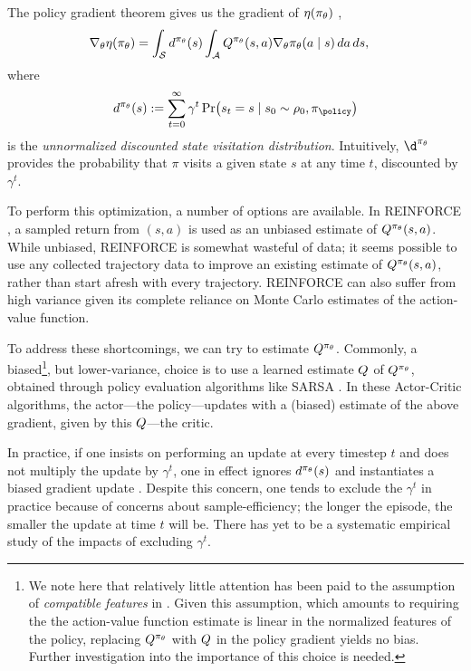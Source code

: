 \documentclass[\main/thesis.tex]{subfiles}
\begin{document}
The {policy gradient theorem} gives us the gradient of $\eta(\pi_\theta)$ \citep{sutton2000policy},
\begin{align}\label{eq:policy-gradient-thm}
    \nabla_\theta \eta(\pi_\theta) &= \int_{\mathcal{S}} d^{\pi_\theta}(s) \int_{\mathcal{A}} Q^{\pi_\theta}(s, a) \nabla_\theta \pi_\theta(a \mid s)\, da\, ds,
\end{align}
%
where 
\begin{align}
    d^{\pi_\policyparams}(s) := \sum_{t = 0}^\infty \gamma^t \Pr(s_t = s \mid s_0 \sim \rho_0, \pi_\policy) 
\end{align}
is the \textit{unnormalized discounted state visitation distribution}. Intuitively, $\d^{\pi_\policyparams}$ provides the probability that $\pi$ visits a given state $s$ at any time $t$, discounted by $\gamma^t$. 

To perform this optimization, a number of options are available. In REINFORCE \citep{williams1992simple}, a sampled return from $(s,a)$ is used as an unbiased estimate of $Q^{\pi_\theta}(s,a)$. While unbiased, REINFORCE is somewhat wasteful of data; it seems possible to use any collected trajectory data to improve an existing estimate of $Q^{\pi_\theta}(s,a)$, rather than start afresh with every trajectory. REINFORCE can also suffer from high variance given its complete reliance on Monte Carlo estimates of the action-value function. 

To address these shortcomings, we can try to estimate $Q^{\pi_\theta}$. Commonly, a biased\footnote{We note here that relatively little attention has been paid to the assumption of \textit{compatible features} in \citet{sutton2000policy}. Given this assumption, which amounts to requiring the the action-value function estimate is linear in the normalized features of the policy, replacing $Q^{\pi_\theta}$ with ${Q}$ in the policy gradient yields no bias. Further investigation into the importance of this choice is needed.}, but lower-variance, choice is to use a learned estimate ${Q}$ of $Q^{\pi_\theta}$, obtained through policy evaluation algorithms like SARSA \citep{sutton2018reinforcement}. In these Actor-Critic algorithms, the actor---the policy---updates with a (biased) estimate of the above gradient, given by this ${Q}$---the critic. 

In practice, if one insists on performing an update at every timestep $t$ and does not multiply the update by $\gamma^t$, one in effect ignores $d^{\pi_\theta}(s)$ and instantiates a biased gradient update \citep{thomas2014bias}. Despite this concern, one tends to exclude the $\gamma^t$ in practice because of concerns about sample-efficiency; the longer the episode, the smaller the update at time $t$ will be. There has yet to be a systematic empirical study of the impacts of excluding $\gamma^t$. %
\end{document}
